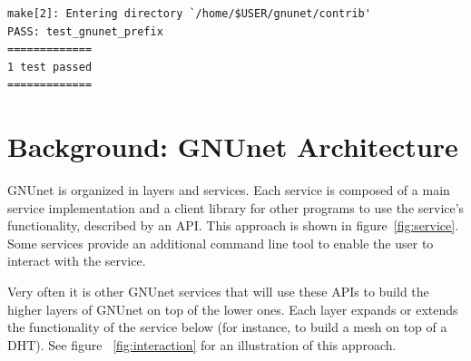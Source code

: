 \documentclass[10pt]{article}
\begin{document}
\begin{verbatim}
make[2]: Entering directory `/home/$USER/gnunet/contrib'
PASS: test_gnunet_prefix
=============
1 test passed
=============
\end{verbatim}


\section{Background: GNUnet Architecture}

GNUnet is organized in layers and services. Each service is composed of a
main service implementation and a client library for other programs to use
the service's functionality, described by an API. This approach is shown in
figure~\ref{fig:service}. Some services provide an additional command line
tool to enable the user to interact with the service.

Very often it is other GNUnet services that will use these APIs to build the
higher layers of GNUnet on top of the lower ones. Each layer expands or extends
the functionality of the service below (for instance, to build a mesh on top of
a DHT). See figure ~\ref{fig:interaction} for an illustration of this approach.
\end{document}
